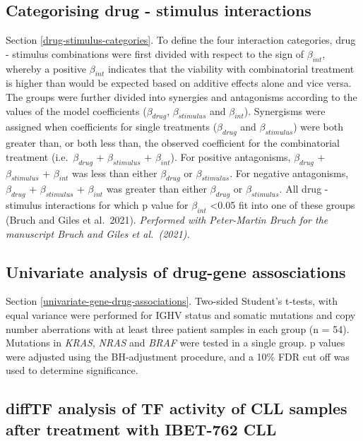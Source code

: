 \documentclass[11pt, a4paper, twosided]{book}
\begin{document}
\hypertarget{drug-stimulus-categories-method}{%
\subsection{Categorising drug - stimulus interactions}\label{drug-stimulus-categories-method}}

Section \ref{drug-stimulus-categories}. To define the four interaction categories, drug - stimulus combinations were first divided with respect to the sign of \(\beta_{int}\), whereby a positive \(\beta_{int}\) indicates that the viability with combinatorial treatment is higher than would be expected based on additive effects alone and vice versa. The groups were further divided into synergies and antagonisms according to the values of the model coefficients (\(\beta_{drug}\), \(\beta_{stimulus}\) and \(\beta_{int}\)). Synergisms were assigned when coefficients for single treatments (\(\beta_{drug}\) and \(\beta_{stimulus}\)) were both greater than, or both less than, the observed coefficient for the combinatorial treatment (i.e.~\(\beta_{drug}\) + \(\beta_{stimulus}\) + \(\beta_{int}\)). For positive antagonisms, \(\beta_{drug}\) + \(\beta_{stimulus}\) + \(\beta_{int}\) was less than either \(\beta_{drug}\) or \(\beta_{stimulus}\). For negative antagonisms, \(\beta_{drug}\) + \(\beta_{stimulus}\) + \(\beta_{int}\) was greater than either \(\beta_{drug}\) or \(\beta_{stimulus}\). All drug - stimulus interactions for which p value for \(\beta_{int}\) \textless0.05 fit into one of these groups (Bruch and Giles et al.~2021). \emph{Performed with Peter-Martin Bruch for the manuscript Bruch and Giles et al.~(2021).}

\hypertarget{drug-gene-method}{%
\subsection{Univariate analysis of drug-gene assosciations}\label{drug-gene-method}}

Section \ref{univariate-gene-drug-associations}. Two-sided Student's t-tests, with equal variance were performed for IGHV status and somatic mutations and copy number aberrations with at least three patient samples in each group (n = 54). Mutations in \emph{KRAS}, \emph{NRAS} and \emph{BRAF} were tested in a single group. p values were adjusted using the BH-adjustment procedure, and a 10\% FDR cut off was used to determine significance.

\hypertarget{ibet-ATACseq-method}{%
\subsection{diffTF analysis of TF activity of CLL samples after treatment with IBET-762 CLL}\label{ibet-ATACseq-method}}
\end{document}
